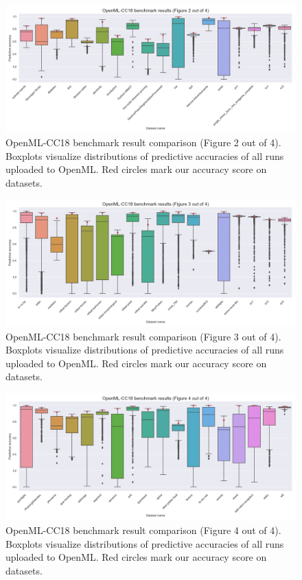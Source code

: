 \begin{figure}
    \includegraphics[width=\textwidth]{../img/openml-boxplot1.png}
    \caption[OpenML-CC18 benchmark result comparison (Figure 2 out of 4)]{
	OpenML-CC18 benchmark result comparison (Figure 2 out of 4).    
    Boxplots visualize distributions of predictive accuracies of all
    runs uploaded to OpenML. Red circles mark our accuracy score on datasets.}
    \label{fig:OpenML:boxplot:1}
\end{figure}

\begin{figure}
    \includegraphics[width=\textwidth]{../img/openml-boxplot2.png}
    \caption[OpenML-CC18 benchmark result comparison (Figure 3 out of 4)]{
	OpenML-CC18 benchmark result comparison (Figure 3 out of 4).    
    Boxplots visualize distributions of predictive accuracies of all
    runs uploaded to OpenML. Red circles mark our accuracy score on datasets.}
    \label{fig:OpenML:boxplot:2}
\end{figure}

\begin{figure}
    \includegraphics[width=\textwidth]{../img/openml-boxplot3.png}
    \caption[OpenML-CC18 benchmark result comparison (Figure 4 out of 4)]{
    OpenML-CC18 benchmark result comparison (Figure 4 out of 4).
    Boxplots visualize distributions of predictive accuracies of all
    runs uploaded to OpenML. Red circles mark our accuracy score on datasets.}
    \label{fig:OpenML:boxplot:3}
\end{figure}